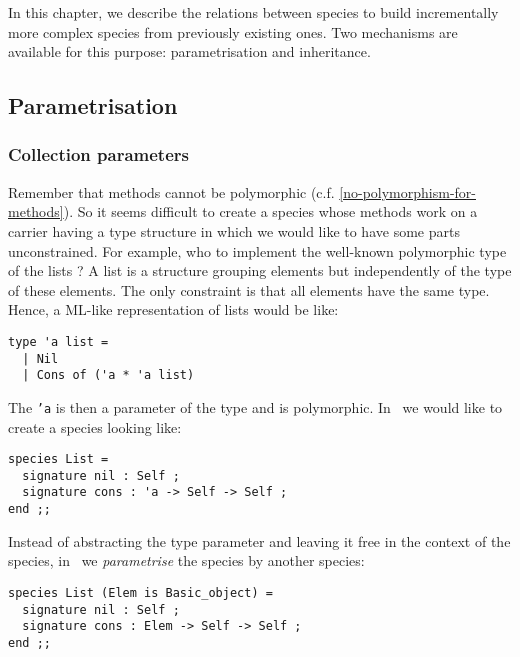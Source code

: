 In this chapter, we describe the relations between species to build
incrementally more complex species from previously existing ones. Two
mechanisms are available for this purpose: parametrisation and
inheritance.



\subsection{Parametrisation}
\label{parametrisation}


\subsubsection{Collection parameters}
\label{collection-parameter}
Remember that methods cannot be polymorphic
(c.f. \ref{no-polymorphism-for-methods}). So it seems difficult to
create a species whose methods work on a carrier having a type
structure in which we would like to have some parts unconstrained. For
example, who to implement the well-known polymorphic type of the
lists ? A list is a structure grouping elements but independently of
the type of these elements. The only constraint is that all elements
have the same type. Hence, a ML-like representation of lists would be
like:
{\scriptsize
\lstset{language=Caml}
\begin{lstlisting}
type 'a list =
  | Nil
  | Cons of ('a * 'a list)
\end{lstlisting}
}

The {\tt 'a} is then a parameter of the type and is polymorphic.
In \focal\ we would like to create a species looking like:
{\scriptsize
\begin{lstlisting}
species List =
  signature nil : Self ;
  signature cons : 'a -> Self -> Self ;
end ;;
\end{lstlisting}
}

Instead of abstracting the type parameter and leaving it free in the
context of the species, in \focal\ we {\em parametrise} the species
by another species:
{\scriptsize
\begin{lstlisting}
species List (Elem is Basic_object) =
  signature nil : Self ;
  signature cons : Elem -> Self -> Self ;
end ;;
\end{lstlisting}
}

